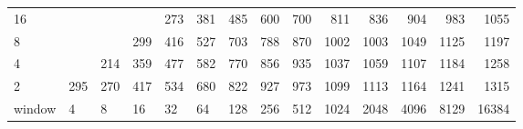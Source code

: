 \begin{table}[h]
\begin{tabular}{lrrrrrrrrrrrrr}
		\multicolumn{1}{|l|}{16} &  &  &  & \cellcolor[HTML]{99E600}273 &
		\cellcolor[HTML]{99E600}381 & \cellcolor[HTML]{E69900}485 &
		\cellcolor[HTML]{E69900}600 & \cellcolor[HTML]{E60000}700 &
		\cellcolor[HTML]{E60000}811 & \cellcolor[HTML]{E60000}836 &
		\cellcolor[HTML]{9900E6}904 & \cellcolor[HTML]{9900E6}983 &
		\cellcolor[HTML]{9900E6}1055 \\ \cline{1-1}
		\multicolumn{1}{|l|}{8} &  &  & \cellcolor[HTML]{99E600}299 &
		\cellcolor[HTML]{E69900}416 & \cellcolor[HTML]{E69900}527 &
		\cellcolor[HTML]{E60000}703 & \cellcolor[HTML]{E60000}788 &
		\cellcolor[HTML]{E60000}870 & \cellcolor[HTML]{9900E6}1002 &
		\cellcolor[HTML]{9900E6}1003 & \cellcolor[HTML]{9900E6}1049 &
		\cellcolor[HTML]{4C00E6}1125 & \cellcolor[HTML]{4C00E6}1197 \\
		\cline{1-1}
		\multicolumn{1}{|l|}{4} &  & \cellcolor[HTML]{99E600}214 &
		\cellcolor[HTML]{99E600}359 & \cellcolor[HTML]{E69900}477 &
		\cellcolor[HTML]{E69900}582 & \cellcolor[HTML]{E60000}770 &
		\cellcolor[HTML]{9900E6}856 & \cellcolor[HTML]{9900E6}935 &
		\cellcolor[HTML]{9900E6}1037 & \cellcolor[HTML]{9900E6}1059 &
		\cellcolor[HTML]{4C00E6}1107 & \cellcolor[HTML]{4C00E6}1184 &
		\cellcolor[HTML]{4C00E6}1258 \\ \cline{1-1}
		\multicolumn{1}{|l|}{2} & \cellcolor[HTML]{99E600}295 &
		\cellcolor[HTML]{99E600}270 & \cellcolor[HTML]{E69900}417 &
		\cellcolor[HTML]{E69900}534 & \cellcolor[HTML]{E60000}680 &
		\cellcolor[HTML]{E60000}822 & \cellcolor[HTML]{9900E6}927 &
		\cellcolor[HTML]{9900E6}973 & \cellcolor[HTML]{4C00E6}1099 &
		\cellcolor[HTML]{4C00E6}1113 & \cellcolor[HTML]{4C00E6}1164 &
		\cellcolor[HTML]{4C00E6}1241 & \cellcolor[HTML]{4C00E6}1315 \\ \hline
		\multicolumn{1}{l|}{window} & \multicolumn{1}{l|}{4} &
		\multicolumn{1}{l|}{8} & \multicolumn{1}{l|}{16} &
		\multicolumn{1}{l|}{32} & \multicolumn{1}{l|}{64} &
		\multicolumn{1}{l|}{128} & \multicolumn{1}{l|}{256} &
		\multicolumn{1}{l|}{512} & \multicolumn{1}{l|}{1024} &
		\multicolumn{1}{l|}{2048} & \multicolumn{1}{l|}{4096} &
		\multicolumn{1}{l|}{8129} & \multicolumn{1}{l|}{16384} \\ \cline{2-14}
	\end{tabular}
\end{table}


